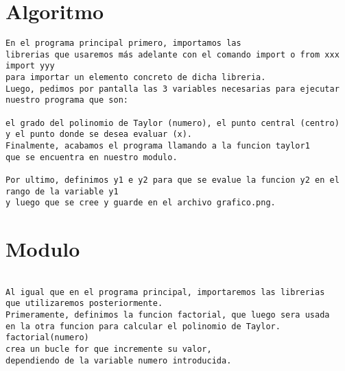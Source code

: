 \section{Algoritmo}
\label{Apendice2:label}

\begin{center}
\begin{footnotesize}
\begin{verbatim}
En el programa principal primero, importamos las 
librerias que usaremos más adelante con el comando import o from xxx import yyy 
para importar un elemento concreto de dicha libreria.
Luego, pedimos por pantalla las 3 variables necesarias para ejecutar 
nuestro programa que son:

el grado del polinomio de Taylor (numero), el punto central (centro) 
y el punto donde se desea evaluar (x). 
Finalmente, acabamos el programa llamando a la funcion taylor1 
que se encuentra en nuestro modulo.

Por ultimo, definimos y1 e y2 para que se evalue la funcion y2 en el rango de la variable y1
y luego que se cree y guarde en el archivo grafico.png.
\end{verbatim}
\end{footnotesize}
\end{center}

\section{Modulo}
\label{Apendice2:label2}

\begin{center}
\begin{footnotesize}
\begin{verbatim}

Al igual que en el programa principal, importaremos las librerias 
que utilizaremos posteriormente. 
Primeramente, definimos la funcion factorial, que luego sera usada 
en la otra funcion para calcular el polinomio de Taylor. factorial(numero) 
crea un bucle for que incremente su valor, 
dependiendo de la variable numero introducida.
 
\end{verbatim}
\end{footnotesize}
\end{center}

